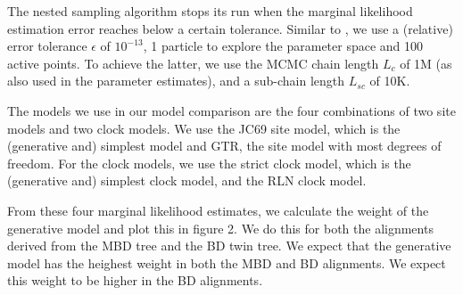 The nested sampling algorithm stops its run 
when the marginal likelihood estimation error 
reaches below a certain tolerance.  
Similar to \cite{maturana2018},
we use a (relative) error tolerance $\epsilon$ of $10^{-13}$,
1 particle to explore the parameter space
and 100 active points. 
To achieve the latter, we use the MCMC chain length $L_c$ of 1M 
(as also used in the parameter estimates),
and a sub-chain length $L_{sc}$ of 10K.

The models we use in our model comparison are the four combinations
of two site models and two clock models. We use the JC69 site model, which
is the (generative and) simplest model and GTR, the site model with most
degrees of freedom. For the clock models, we use the strict clock model,
which is the (generative and) simplest clock model, and the RLN clock model.

From these four marginal likelihood estimates, we calculate the weight of
the generative model and plot this in figure 2. We do this for both the 
alignments derived from the MBD tree and the BD twin tree. We expect that
the generative model has the heighest weight in both the MBD and BD alignments.
We expect this weight to be higher in the BD alignments.
\fi
